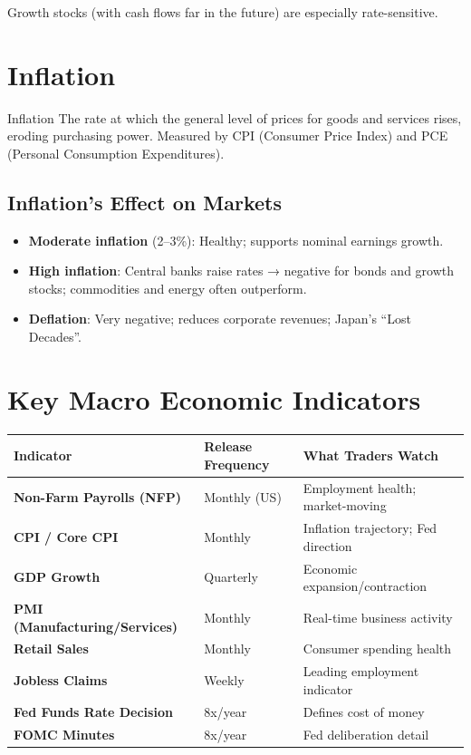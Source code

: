 Growth stocks (with cash flows far in the future) are especially rate-sensitive.

\section{Inflation}

\begin{keyterm}{Inflation}
The rate at which the general level of prices for goods and services rises,
eroding purchasing power. Measured by CPI (Consumer Price Index) and PCE (Personal
Consumption Expenditures).
\end{keyterm}

\subsection{Inflation's Effect on Markets}
\begin{itemize}
  \item \textbf{Moderate inflation} (2--3\%): Healthy; supports nominal earnings growth.
  \item \textbf{High inflation}: Central banks raise rates → negative for bonds and growth stocks;
        commodities and energy often outperform.
  \item \textbf{Deflation}: Very negative; reduces corporate revenues; Japan's ``Lost Decades''.
\end{itemize}

\section{Key Macro Economic Indicators}

\begin{center}
\begin{tabular}{>{\bfseries}p{3.5cm} p{3cm} p{6.5cm}}
\toprule
Indicator & Release Frequency & What Traders Watch \\
\midrule
Non-Farm Payrolls (NFP) & Monthly (US) & Employment health; market-moving \\
CPI / Core CPI & Monthly & Inflation trajectory; Fed direction \\
GDP Growth & Quarterly & Economic expansion/contraction \\
PMI (Manufacturing/Services) & Monthly & Real-time business activity \\
Retail Sales & Monthly & Consumer spending health \\
Jobless Claims & Weekly & Leading employment indicator \\
Fed Funds Rate Decision & 8x/year & Defines cost of money \\
FOMC Minutes & 8x/year & Fed deliberation detail \\
\bottomrule
\end{tabular}
\end{center}

